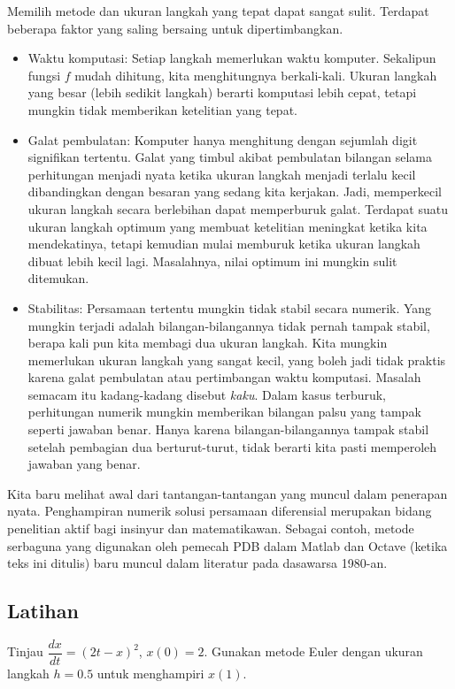 Memilih metode dan ukuran langkah yang tepat dapat sangat sulit.
Terdapat beberapa faktor yang saling bersaing untuk dipertimbangkan.
\begin{itemize}
\item Waktu komputasi: Setiap langkah memerlukan waktu komputer.  Sekalipun
fungsi $f$ mudah dihitung, kita menghitungnya berkali-kali.
Ukuran langkah yang besar (lebih sedikit langkah) berarti komputasi lebih cepat, tetapi mungkin tidak
memberikan ketelitian yang tepat.
\item Galat pembulatan: Komputer hanya menghitung dengan sejumlah
digit signifikan tertentu.  Galat yang timbul akibat pembulatan bilangan selama
perhitungan menjadi nyata ketika ukuran langkah menjadi
terlalu kecil dibandingkan dengan besaran yang sedang kita kerjakan.
Jadi, memperkecil
ukuran langkah secara berlebihan dapat memperburuk galat.
Terdapat suatu ukuran langkah optimum
yang membuat ketelitian meningkat ketika kita mendekatinya, tetapi kemudian mulai
memburuk ketika ukuran langkah dibuat
lebih kecil lagi.  Masalahnya, nilai optimum ini mungkin sulit ditemukan.
\item Stabilitas: Persamaan tertentu mungkin tidak stabil secara numerik.  Yang mungkin
terjadi adalah bilangan-bilangannya tidak pernah tampak stabil, berapa kali pun
kita membagi dua ukuran langkah.  Kita mungkin memerlukan ukuran langkah yang sangat kecil,
yang boleh jadi tidak praktis karena galat pembulatan atau pertimbangan
waktu komputasi.  Masalah semacam itu kadang-kadang disebut
\emph{kaku}.
Dalam kasus terburuk, perhitungan numerik mungkin
memberikan bilangan palsu yang tampak seperti jawaban benar.  Hanya karena
bilangan-bilangannya tampak stabil setelah pembagian dua berturut-turut, tidak berarti kita pasti
memperoleh jawaban yang benar.
\end{itemize}

Kita baru melihat awal dari tantangan-tantangan yang muncul dalam
penerapan nyata.  Penghampiran numerik solusi persamaan
diferensial merupakan bidang penelitian aktif bagi insinyur dan matematikawan.  Sebagai
contoh, metode serbaguna yang digunakan oleh pemecah PDB dalam Matlab dan
Octave (ketika teks ini ditulis) baru muncul dalam literatur
pada dasawarsa 1980-an.

\subsection{Latihan}

\begin{exercise}
Tinjau $\dfrac{dx}{dt} = {(2t-x)}^2$, $x(0)=2$.  Gunakan metode Euler
dengan ukuran langkah $h=0.5$ untuk menghampiri $x(1)$.
\end{exercise}


